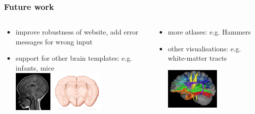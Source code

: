 \documentclass[10pt,xcolor=table,aspectratio=169]{beamer}
\begin{document}
\begin{frame}
 \frametitle{Future work}

 \vspace{-2em}
 
 \begin{columns}
  \begin{column}[t]{0.5\textwidth}
  \begin{itemize}
  \item improve robustness of website, add error messages for wrong input
  
  \vspace{2em}
  
  \item support for other brain templates: e.g. infants, mice\\
  \vspace{1em}
  \includegraphics[height=2cm]{images/infantBrain} \includegraphics[height=2cm]{images/mouse}
    
   \end{itemize}
  \end{column}
  \begin{column}[t]{0.5\textwidth}

  \begin{itemize}
  \item more atlases: e.g. Hammers
  
  \vspace{3em}
  
  \item other visualisations: e.g. white-matter tracts\\
  \vspace{2em}
  
  \includegraphics[height=2cm]{images/wmTracts}

  \end{itemize}


\end{column}
\end{columns}
\end{frame}
\end{document}
